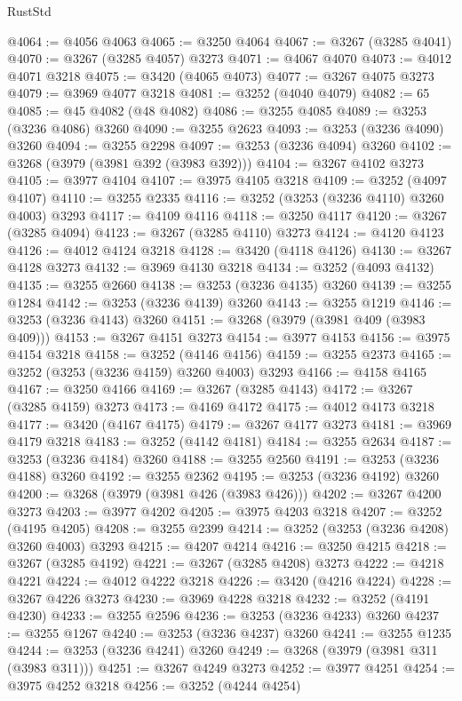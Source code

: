 \begin{lexlean}{RustStd}
\begin{coremodule}
{\begin{coremodule}
{{{{{{{{{{{{{{{{{{{{{{{{{{{{{{{{{{{{{{{@4064 := @4056 @4063
@4065 := @3250 @4064
@4067 := @3267 (@3285 @4041)
@4070 := @3267 (@3285 @4057) @3273
@4071 := @4067 @4070
@4073 := @4012 @4071 @3218
@4075 := @3420 (@4065 @4073)
@4077 := @3267 @4075 @3273
@4079 := @3969 @4077 @3218
@4081 := @3252 (@4040 @4079)
@4082 := 65
@4085 := @45 @4082 (@48 @4082)
@4086 := @3255 @4085
@4089 := @3253 (@3236 @4086) @3260
@4090 := @3255 @2623
@4093 := @3253 (@3236 @4090) @3260
@4094 := @3255 @2298
@4097 := @3253 (@3236 @4094) @3260
@4102 := @3268 (@3979 (@3981 @392 (@3983 @392)))
@4104 := @3267 @4102 @3273
@4105 := @3977 @4104
@4107 := @3975 @4105 @3218
@4109 := @3252 (@4097 @4107)
@4110 := @3255 @2335
@4116 := @3252 (@3253 (@3236 @4110) @3260 @4003) @3293
@4117 := @4109 @4116
@4118 := @3250 @4117
@4120 := @3267 (@3285 @4094)
@4123 := @3267 (@3285 @4110) @3273
@4124 := @4120 @4123
@4126 := @4012 @4124 @3218
@4128 := @3420 (@4118 @4126)
@4130 := @3267 @4128 @3273
@4132 := @3969 @4130 @3218
@4134 := @3252 (@4093 @4132)
@4135 := @3255 @2660
@4138 := @3253 (@3236 @4135) @3260
@4139 := @3255 @1284
@4142 := @3253 (@3236 @4139) @3260
@4143 := @3255 @1219
@4146 := @3253 (@3236 @4143) @3260
@4151 := @3268 (@3979 (@3981 @409 (@3983 @409)))
@4153 := @3267 @4151 @3273
@4154 := @3977 @4153
@4156 := @3975 @4154 @3218
@4158 := @3252 (@4146 @4156)
@4159 := @3255 @2373
@4165 := @3252 (@3253 (@3236 @4159) @3260 @4003) @3293
@4166 := @4158 @4165
@4167 := @3250 @4166
@4169 := @3267 (@3285 @4143)
@4172 := @3267 (@3285 @4159) @3273
@4173 := @4169 @4172
@4175 := @4012 @4173 @3218
@4177 := @3420 (@4167 @4175)
@4179 := @3267 @4177 @3273
@4181 := @3969 @4179 @3218
@4183 := @3252 (@4142 @4181)
@4184 := @3255 @2634
@4187 := @3253 (@3236 @4184) @3260
@4188 := @3255 @2560
@4191 := @3253 (@3236 @4188) @3260
@4192 := @3255 @2362
@4195 := @3253 (@3236 @4192) @3260
@4200 := @3268 (@3979 (@3981 @426 (@3983 @426)))
@4202 := @3267 @4200 @3273
@4203 := @3977 @4202
@4205 := @3975 @4203 @3218
@4207 := @3252 (@4195 @4205)
@4208 := @3255 @2399
@4214 := @3252 (@3253 (@3236 @4208) @3260 @4003) @3293
@4215 := @4207 @4214
@4216 := @3250 @4215
@4218 := @3267 (@3285 @4192)
@4221 := @3267 (@3285 @4208) @3273
@4222 := @4218 @4221
@4224 := @4012 @4222 @3218
@4226 := @3420 (@4216 @4224)
@4228 := @3267 @4226 @3273
@4230 := @3969 @4228 @3218
@4232 := @3252 (@4191 @4230)
@4233 := @3255 @2596
@4236 := @3253 (@3236 @4233) @3260
@4237 := @3255 @1267
@4240 := @3253 (@3236 @4237) @3260
@4241 := @3255 @1235
@4244 := @3253 (@3236 @4241) @3260
@4249 := @3268 (@3979 (@3981 @311 (@3983 @311)))
@4251 := @3267 @4249 @3273
@4252 := @3977 @4251
@4254 := @3975 @4252 @3218
@4256 := @3252 (@4244 @4254)
}}}}}}}}}}}}}}}}}}}}}}}}}}}}}}}}}}}}}}}
\end{coremodule}}
\end{coremodule}
\end{lexlean}

